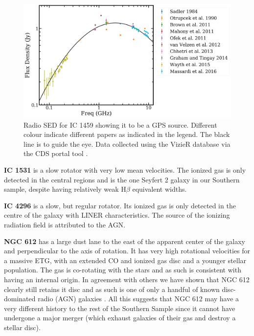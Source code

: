 \begin{figure}
	\centering
	\includegraphics[height=0.4\textwidth]{appendix/appendix2/ic1459.png}
	\caption[Radio SED for IC 1459]{Radio SED for IC 1459 showing it to be a GPS source. Different colour indicate different papers as indicated in the legend. The black line is to guide the eye. Data collected using the VizieR database via the CDS portal tool \citep{Ochsenbein2000}.} 
	\label{fig:ic1459radio}
\end{figure}
\nocite{Brown2011, Massardi2016, Ofek2011, Wayth2015, Mahony2011, Otrupcek1990, Graham2014, Chhetri2013, VanVelzen2012, Sadler1984}

\textbf{IC 1531} is a slow rotator with very low mean velocities. The ionized gas is only detected in the central regions and is the one Seyfert 2 galaxy in our Southern sample, despite having relatively weak H$\beta$ equivalent widths. 

\textbf{IC 4296} is a slow, but regular rotator. Its ionized gas is only detected in the centre of the galaxy with LINER characteristics. The source of the ionizing radiation field is attributed to the AGN. 

\textbf{NGC 612} has a large dust lane to the east of the apparent center of the galaxy and perpendicular to the axis of rotation. It has very high rotational velocities for a massive ETG, with an extended CO and ionized gas disc and a younger stellar population. The gas is co-rotating with the stars and as such is consistent with having an internal origin. In agreement with others \citep[e.g.][]{Ledlow1998, Emonts2009} we have shown that NGC 612 clearly still retains it disc and as such is one of only a handful of known disc-dominated radio (AGN) galaxies \citep[e.g.][]{Heckman1982, Ledlow1998, Morganti2011, Mao2015}. All this suggests that NGC 612 may have a very different history to the rest of the Southern Sample since it cannot have undergone a major merger (which exhaust galaxies of their gas and destroy a stellar disc).

